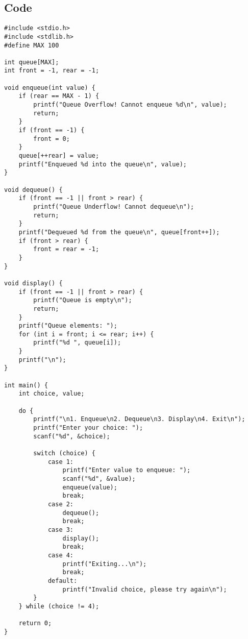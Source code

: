 \documentclass[12pt,a4paper]{article}
\begin{document}
\subsection*{Code}
\begin{lstlisting}
#include <stdio.h>
#include <stdlib.h>
#define MAX 100

int queue[MAX];
int front = -1, rear = -1;

void enqueue(int value) {
    if (rear == MAX - 1) {
        printf("Queue Overflow! Cannot enqueue %d\n", value);
        return;
    }
    if (front == -1) {
        front = 0;
    }
    queue[++rear] = value;
    printf("Enqueued %d into the queue\n", value);
}

void dequeue() {
    if (front == -1 || front > rear) {
        printf("Queue Underflow! Cannot dequeue\n");
        return;
    }
    printf("Dequeued %d from the queue\n", queue[front++]);
    if (front > rear) {
        front = rear = -1;
    }
}

void display() {
    if (front == -1 || front > rear) {
        printf("Queue is empty\n");
        return;
    }
    printf("Queue elements: ");
    for (int i = front; i <= rear; i++) {
        printf("%d ", queue[i]);
    }
    printf("\n");
}

int main() {
    int choice, value;

    do {
        printf("\n1. Enqueue\n2. Dequeue\n3. Display\n4. Exit\n");
        printf("Enter your choice: ");
        scanf("%d", &choice);

        switch (choice) {
            case 1:
                printf("Enter value to enqueue: ");
                scanf("%d", &value);
                enqueue(value);
                break;
            case 2:
                dequeue();
                break;
            case 3:
                display();
                break;
            case 4:
                printf("Exiting...\n");
                break;
            default:
                printf("Invalid choice, please try again\n");
        }
    } while (choice != 4);

    return 0;
}
\end{lstlisting}
\end{document}

